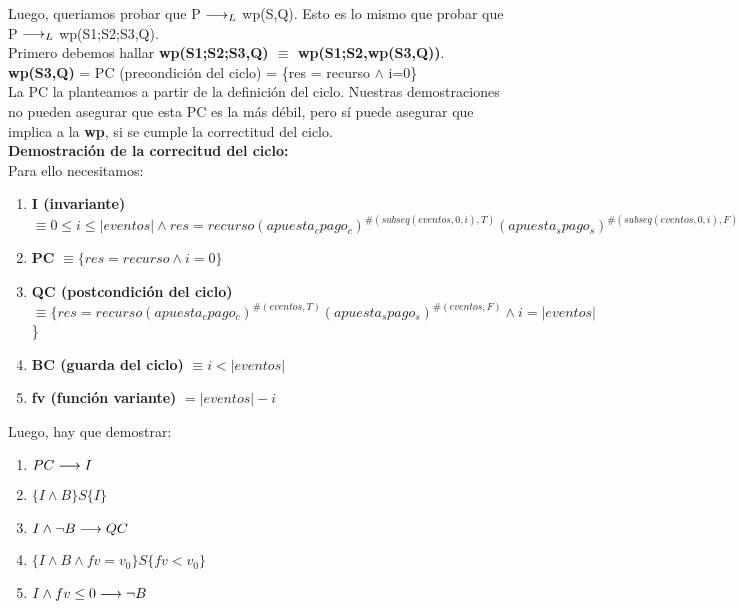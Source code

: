 \documentclass[10pt,a4paper]{article}
\begin{document}
\begin{flushleft}
\vspace{3mm}
Luego, queriamos probar que P $\longrightarrow _L$ wp(S,Q). Esto es lo mismo que probar que P $\longrightarrow _L$ wp(S1;S2;S3,Q).\\
\vspace{3mm}
Primero debemos hallar \textbf{wp(S1;S2;S3,Q) $\equiv$ wp(S1;S2,wp(S3,Q))}.\\
\vspace{3mm}
\textbf{wp(S3,Q)} = PC (precondición del ciclo) = \{res = recurso $\wedge$ i=0\}\\
\vspace{3mm}
La PC la planteamos a partir de la definición del ciclo. 
Nuestras demostraciones no pueden asegurar que esta PC es la más débil, 
pero sí puede asegurar que implica a la \textbf{wp}, si se cumple la correctitud del ciclo.\\
\vspace{10mm}
\textbf{Demostración de la correcitud del ciclo:}\\
\vspace{3mm}
Para ello necesitamos: 
\begin{enumerate} \setlength\itemsep{0cm}
	\item \textbf{I (invariante)} $\equiv 0\leq i \leq |eventos| \wedge res=recurso(apuesta_cpago_c)^{\#(subseq(eventos,0,i),T)}(apuesta_spago_s)^{\#(subseq(eventos,0,i),F)}$
	\item \textbf{PC} $\equiv \{res= recurso \wedge i=0\}$
	\item \textbf{QC (postcondición del ciclo)} $\equiv \{res=recurso(apuesta_cpago_c)^{\#(eventos,T)}(apuesta_spago_s)^{\#(eventos,F)} \wedge i=|eventos|$\}
	\item \textbf{BC (guarda del ciclo)} $\equiv i < |eventos|$
	\item \textbf{fv (función variante)} $= |eventos|-i$
\end{enumerate}

Luego, hay que demostrar:
\begin{enumerate} \setlength\itemsep{0cm}
	\item \textbf{$PC \longrightarrow I$}
	\item \textbf{$\{ I \wedge B \}S\{ I \}$}
	\item \textbf{$I \wedge \neg B \longrightarrow QC$}
	\item \textbf{$\{ I \wedge B \wedge fv= v_0 \}S\{ fv<v_0 \}$}
	\item \textbf{$I \wedge fv\leq0 \longrightarrow \neg B$} 

\end{enumerate}


\end{flushleft}
\end{document}
